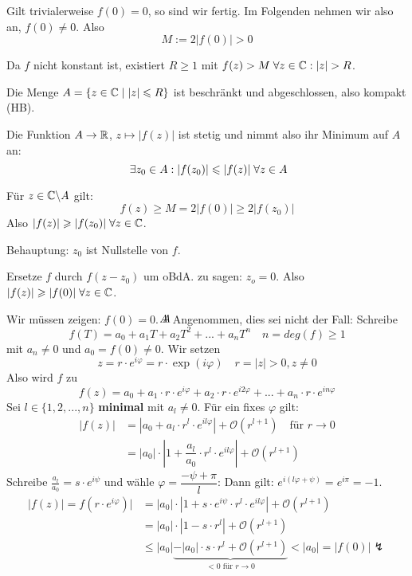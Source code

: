 \documentclass[main.tex]{subfiles}
\begin{document}
\begin{Beweis}
  Gilt trivialerweise $f(0) = 0$, so sind wir fertig. Im Folgenden nehmen wir also an, $f(0) \neq 0$. Also
  $$M := 2 |f(0)| > 0$$

  Da $f$ nicht konstant ist, existiert $R \geq 1$ mit $f(z) > M \;\forall z \in \mathbb{C} : |z| > R$.

  Die Menge $A = \{ z\in \mathbb{C} \mid |z|\leqslant R\}$ ist beschränkt und abgeschlossen, also kompakt (HB).

  Die Funktion $A \to \mathbb{R}$, $z \mapsto |f(z)|$ ist stetig und nimmt also ihr Minimum auf $A$ an:
  $$\;\exists z_0 \in A : |f(z_0)| \leqslant |f(z)| \;\forall z \in A$$

  Für $z \in \mathbb{C} \backslash A$ gilt:
  $$f(z) \geq M = 2 |f(0)| \geq 2 |f(z_0)|$$
  Also $|f(z)| \geqslant |f(z_0)| \;\forall z \in \mathbb{C}$.

  Behauptung: $z_0$ ist Nullstelle von $f$.

  Ersetze $f$ durch $f(z - z_0)$ um oBdA. zu sagen: $z_o = 0$. Also $|f(z)| \geqslant |f(0)| \;\forall z \in \mathbb{C}$.

  Wir müssen zeigen: $f(0) = 0$. $A\hspace{-1em}A$ Angenommen, dies sei nicht der Fall: Schreibe
  $$f(T) = a_0 + a_1 T + a_2 T^2 + ... + a_n T^n \quad n = deg(f) \geq 1$$
  mit $a_n \neq 0$ und $a_0 = f(0) \neq 0$. Wir setzen
  $$z = r \cdot e^{i\varphi} = r \cdot \exp(i\varphi) \quad r = |z| > 0, z \neq 0$$
  Also wird $f$ zu
  $$f(z) = a_0 + a_1 \cdot r \cdot e^{i\varphi} + a_2 \cdot r \cdot e^{i 2 \varphi} + ... + a_n \cdot r \cdot e^{i n \varphi}$$
  Sei $l \in \{1,2,...,n\}$ \textbf{minimal} mit $a_l \neq 0$. Für ein fixes $\varphi$ gilt:
  $$\begin{aligned}
    |f(z)| & = |a_0 + a_l \cdot r^l \cdot e^{i l \varphi} | + \mathcal{O}(r^{l+1}) \quad \text{für } r \to 0 \\
    & = |a_0| \cdot \left|1 + \dfrac{a_l}{a_0} \cdot r^l \cdot e^{i l \varphi} \right| + \mathcal{O}(r^{l+1})
  \end{aligned}$$
  Schreibe $\frac{a_l}{a_0} = s \cdot e^{i \psi}$ und wähle $\varphi = \dfrac{-\psi + \pi}{l}$: Dann gilt: $e^{i(l \varphi + \psi)} = e^{i \pi} = -1$.
  $$\begin{aligned}
    |f(z)| = f(r \cdot e^{i \varphi})| & = |a_0| \cdot |1 + s \cdot e^{i \psi} \cdot r^l \cdot e^{i l \varphi}| + \mathcal{O}(r^{l+1}) \\
    & = |a_0| \cdot |1 - s \cdot r^l| + \mathcal{O}(r^{l+1}) \\
    & \leq |a_0| \underbrace{- |a_0| \cdot s \cdot r^l + \mathcal{O}(r^{l+1})}_{< 0 \text{ für } r \to 0} < |a_0| = |f(0)| \lightning
  \end{aligned}$$
\end{Beweis}
\end{document}
